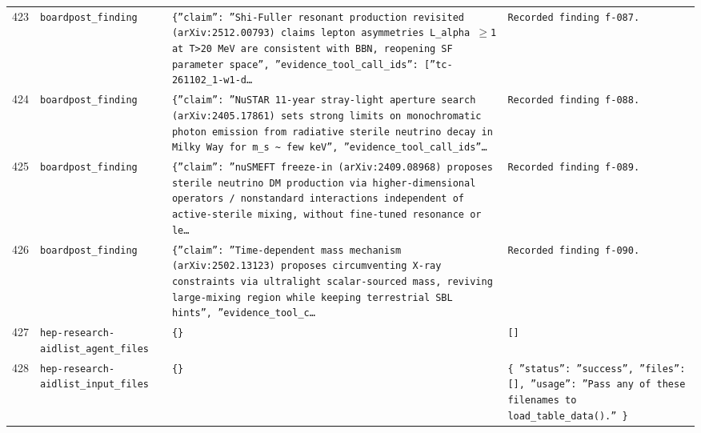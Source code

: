 \documentclass[11pt,a4paper]{article}
\begin{document}
\begin{longtable}{@{}p{}p{}p{}p{}@{}}
423 & \texttt{board}\newline\texttt{post\_\allowbreak{}finding} & \texttt{\{''claim'':\allowbreak{} ''Shi-Fuller resonant production revisited (arXiv:\allowbreak{}2512.00793)\allowbreak{} claims lepton asymmetries L\_\allowbreak{}alpha $\geq$1 at T\textgreater{}\allowbreak{}20 MeV are consistent with BBN,\allowbreak{} reopening SF parameter space'',\allowbreak{} ''evidence\_\allowbreak{}tool\_\allowbreak{}call\_\allowbreak{}ids'':\allowbreak{} [''tc-261102\_\allowbreak{}1-w1-d\ldots{}\allowbreak{}} & \texttt{Recorded finding f-087.} \\
424 & \texttt{board}\newline\texttt{post\_\allowbreak{}finding} & \texttt{\{''claim'':\allowbreak{} ''NuSTAR 11-year stray-light aperture search (arXiv:\allowbreak{}2405.17861)\allowbreak{} sets strong limits on monochromatic photon emission from radiative sterile neutrino decay in Milky Way for m\_\allowbreak{}s \textasciitilde{}\allowbreak{} few keV'',\allowbreak{} ''evidence\_\allowbreak{}tool\_\allowbreak{}call\_\allowbreak{}ids''\ldots{}\allowbreak{}} & \texttt{Recorded finding f-088.} \\
425 & \texttt{board}\newline\texttt{post\_\allowbreak{}finding} & \texttt{\{''claim'':\allowbreak{} ''nuSMEFT freeze-in (arXiv:\allowbreak{}2409.08968)\allowbreak{} proposes sterile neutrino DM production via higher-dimensional operators /\allowbreak{} nonstandard interactions independent of active-sterile mixing,\allowbreak{} without fine-tuned resonance or le\ldots{}\allowbreak{}} & \texttt{Recorded finding f-089.} \\
426 & \texttt{board}\newline\texttt{post\_\allowbreak{}finding} & \texttt{\{''claim'':\allowbreak{} ''Time-dependent mass mechanism (arXiv:\allowbreak{}2502.13123)\allowbreak{} proposes circumventing X-ray constraints via ultralight scalar-sourced mass,\allowbreak{} reviving large-mixing region while keeping terrestrial SBL hints'',\allowbreak{} ''evidence\_\allowbreak{}tool\_\allowbreak{}c\ldots{}\allowbreak{}} & \texttt{Recorded finding f-090.} \\
427 & \texttt{hep-research-aid}\newline\texttt{list\_\allowbreak{}agent\_\allowbreak{}files} & \texttt{\{\}\allowbreak{}} & \texttt{[]\allowbreak{}} \\
428 & \texttt{hep-research-aid}\newline\texttt{list\_\allowbreak{}input\_\allowbreak{}files} & \texttt{\{\}\allowbreak{}} & \texttt{\{   ''status'':\allowbreak{} ''success'',\allowbreak{}   ''files'':\allowbreak{} []\allowbreak{},\allowbreak{}   ''usage'':\allowbreak{} ''Pass any of these filenames to load\_\allowbreak{}table\_\allowbreak{}data()\allowbreak{}.'' \}\allowbreak{}} \\

\end{longtable}
\end{document}

